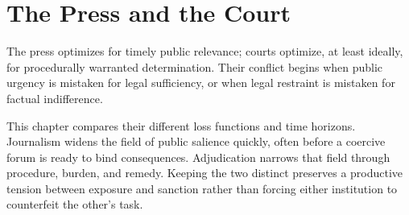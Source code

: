 
\chapter{The Press and the Court}
\label{ch:ch054}

The press optimizes for timely public relevance; courts optimize, at least ideally, for procedurally warranted determination. Their conflict begins when public urgency is mistaken for legal sufficiency, or when legal restraint is mistaken for factual indifference.

This chapter compares their different loss functions and time horizons. Journalism widens the field of public salience quickly, often before a coercive forum is ready to bind consequences. Adjudication narrows that field through procedure, burden, and remedy. Keeping the two distinct preserves a productive tension between exposure and sanction rather than forcing either institution to counterfeit the other's task.
